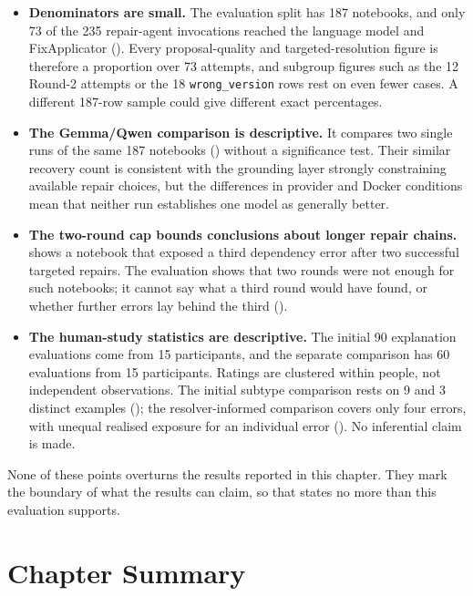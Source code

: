 \begin{itemize}
  \item \textbf{Denominators are small.} The evaluation split has 187
    notebooks, and only 73 of the 235 repair-agent invocations reached the
    language model and FixApplicator (). Every
    proposal-quality and targeted-resolution figure is therefore a
    proportion over 73 attempts, and subgroup figures such as the 12
    Round-2 attempts or the 18 \texttt{wrong\_version} rows rest on even
    fewer cases. A different 187-row sample could give different exact
    percentages.
  \item \textbf{The Gemma/Qwen comparison is descriptive.} It compares two
    single runs of the same 187 notebooks ()
    without a significance test. Their similar recovery count is consistent
    with the grounding layer strongly constraining available repair choices,
    but the differences in provider and Docker conditions mean that neither
    run establishes one model as generally better.
  \item \textbf{The two-round cap bounds conclusions about longer repair
    chains.}  shows a notebook that exposed a third
    dependency error after two successful targeted repairs. The evaluation
    shows that two rounds were not enough for such notebooks; it cannot
    say what a third round would have found, or whether further errors
    lay behind the third ().
  \item \textbf{The human-study statistics are descriptive.} The initial
    90 explanation evaluations come from 15 participants, and the separate
    comparison has 60 evaluations from 15 participants. Ratings are clustered
    within people, not independent observations. The initial subtype comparison
    rests on 9 and 3 distinct examples (); the
    resolver-informed comparison covers only four errors, with unequal realised
    exposure for an individual error (). No
    inferential claim is made.
\end{itemize}

None of these points overturns the results reported in this chapter. They
mark the boundary of what the results can claim, so that
 states no more than this evaluation supports.

\section{Chapter Summary}
\label{sec:v-summary}

